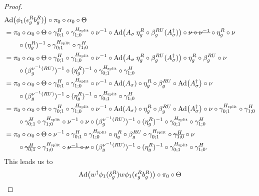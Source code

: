 \documentclass[12pt,a4paper,twoside]{article}
\newcommand{\stkout}[1]{\ifmmode\text{\sout{\ensuremath{#1}}}\else\sout{#1}\fi}
\let\originalleft\left
\let\originalright\right
\renewcommand{\left}{\mathopen{}\mathclose\bgroup\originalleft}
\renewcommand{\right}{\aftergroup\egroup\originalright}
\newcommand{\Ad}[1]{\textrm{Ad}\left(#1\right)}
\theoremstyle{definition}
\numberwithin{equation}{section}
\begin{document}
\begin{proof}
	\begin{align}
		&\Ad{\phi_1(\epsilon_g^R b_g^R)}\circ\pi_0\circ\alpha_0\circ\Theta\\
		&=\pi_0\circ\alpha_0\circ\Theta\circ\gamma^H_{0;1}\circ\gamma^{H_{\text{split}}}_{1;0}\circ\nu^{-1}\circ\Ad{A_\sigma\: \eta_g^R\circ\beta_g^{RU}(A_\sigma^\dagger)}\circ\stkout{\nu\circ\nu^{-1}}\circ\eta_g^R\circ\nu\\
		\nonumber
		&\qquad\circ(\eta_g^R)^{-1}\circ\gamma^{H_{\text{split}}}_{0;1}\circ\gamma^{H}_{1;0}\\
		&=\pi_0\circ\alpha_0\circ\Theta\circ\gamma^H_{0;1}\circ\gamma^{H_{\text{split}}}_{1;0}\circ\nu^{-1}\circ\Ad{A_\sigma\: \eta_g^R\circ\beta_g^{RU}(A_\sigma^\dagger)}\circ\eta_g^R\circ\beta_g^{RU}\circ\nu\\
		\nonumber
		&\qquad\circ(\beta_g^{\nu^{-1}(RU)})^{-1}\circ(\eta_g^R)^{-1}\circ\gamma^{H_{\text{split}}}_{0;1}\circ\gamma^{H}_{1;0}\\
		&=\pi_0\circ\alpha_0\circ\Theta\circ\gamma^H_{0;1}\circ\gamma^{H_{\text{split}}}_{1;0}\circ\nu^{-1}\circ\Ad{A_\sigma}\circ\eta_g^R\circ\beta_g^{RU}\circ\Ad{A_\sigma^\dagger}\circ\nu\\
		\nonumber
		&\qquad\circ(\beta_g^{\nu^{-1}(RU)})^{-1}\circ(\eta_g^R)^{-1}\circ\gamma^{H_{\text{split}}}_{0;1}\circ\gamma^{H}_{1;0}\\
		&=\pi_0\circ\alpha_0\circ\Theta\circ\gamma^H_{0;1}\circ\gamma^{H_{\text{split}}}_{1;0}\circ\nu^{-1}\circ\Ad{A_\sigma}\circ\eta_g^R\circ\beta_g^{RU}\circ\Ad{A_\sigma^\dagger}\circ\nu\circ\gamma^{H_\text{split}}_{0;1}\circ\gamma^H_{1;0}\\
		\nonumber
		&\qquad \circ\gamma^H_{0;1}\circ\gamma^{H_\text{split}}_{1;0}\circ\nu^{-1}\circ\nu\circ(\beta_g^{\nu^{-1}(RU)})^{-1}\circ(\eta_g^R)^{-1}\circ\gamma^{H_{\text{split}}}_{0;1}\circ\gamma^{H}_{1;0}\\
		&=\pi_0\circ\alpha_0\circ\Theta\circ\nu^{-1}\circ\gamma^H_{0;1}\circ\gamma^{H_{\text{split}}}_{1;0}\circ\eta_g^R\circ\beta_g^{RU}\circ\gamma^{H_\text{split}}_{0;1}\circ\stkout{\gamma^H_{1;0}}\circ\nu\\
		\nonumber
		&\qquad \circ\stkout{\gamma^H_{0;1}}\circ\gamma^{H_\text{split}}_{1;0}\circ\stkout{\nu^{-1}\circ\nu}\circ(\beta_g^{\nu^{-1}(RU)})^{-1}\circ(\eta_g^R)^{-1}\circ\gamma^{H_{\text{split}}}_{0;1}\circ\gamma^{H}_{1;0}.
	\end{align}
	This leads us to
	\begin{align}
		&\Ad{w^\dagger\phi_1(\delta_g^R)w\phi_1(\epsilon_g^R b_g^R)}\circ\pi_0\circ\Theta\\

\end{align}
\end{proof}
\end{document}
